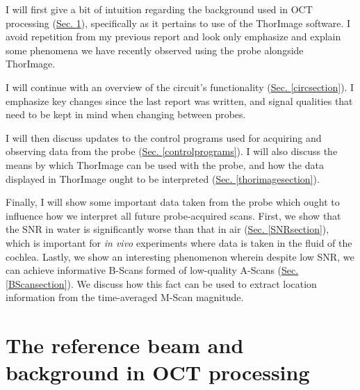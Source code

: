 \documentclass{article}
\begin{document}
\par{I will first give a bit of intuition regarding the background used in OCT processing (\hyperlink{bgsection}{Sec. \ref{bgsection}}), specifically as it pertains to use of the ThorImage software. I avoid repetition from my previous report and look only emphasize and explain some phenomena we have recently observed using the probe alongside ThorImage.}
\par{I will continue with an overview of the circuit's functionality (\hyperlink{circsection}{Sec. \ref{circsection}}). I emphasize key changes since the last report was written, and signal qualities that need to be kept in mind when changing between probes.}
\par{I will then discuss updates to the control programs used for acquiring and observing data from the probe (\hyperlink{controlprograms}{Sec. \ref{controlprograms}}). I will also discuss the means by which ThorImage can be used with the probe, and how the data displayed in ThorImage ought to be interpreted (\hyperlink{thorimagesection}{Sec. \ref{thorimagesection}}).}
\par{Finally, I will show some important data taken from the probe which ought to influence how we interpret all future probe-acquired scans. First, we show that the SNR in water is significantly worse than that in air (\hyperlink{SNRsection}{Sec. \ref{SNRsection}}), which is important for \textit{in vivo} experiments where data is taken in the fluid of the cochlea. Lastly, we show an interesting phenomenon wherein despite low SNR, we can achieve informative B-Scans formed of low-quality A-Scans (\hyperlink{BScansection}{Sec. \ref{BScansection}}). We discuss how this fact can be used to extract location information from the time-averaged M-Scan magnitude.}

\section{The reference beam and background in OCT processing}\label{bgsection}
\hypertarget{bgsection}{}
\end{document}

